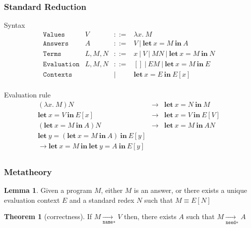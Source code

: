 \documentclass[dvipdfmx,cjk,xcolor=dvipsnames,envcountsect,notheorems,12pt]{beamer}
\theoremstyle{definition}
\newtheorem{theorem}{Theorem}
\newtheorem{lemma}{Lemma}
\newcommand{\keyword}[1]{\mathbf{#1}}
\newcommand{\LET}{\keyword{let}}
\newcommand{\IN}{\keyword{in}}
\begin{document}
\begin{frame}
	\frametitle{Standard Reduction}
	\Large
	Syntax
	{\normalsize \[\begin{array}{llcl}
		\texttt{Values} & V & ::= & \lambda x.~M \\
		\texttt{Answers} & A & ::= & V~|~\LET~x=M~\IN~A \\
		\texttt{Terms} & L, M, N & ::= & x~|~V~|~MN~|~\LET~x=M~\IN~N\\
		\texttt{Evaluation} & L, M, N & ::= & []~|~EM~|~\LET~x=M~\IN~E \\
		\texttt{Contexts} & & | & \LET~x=E~\IN~E[x] \\
	\end{array}\]}

	Evaluation rule
	{\small \[\begin{array}{lcl}
		(\lambda x.~M) N & \longrightarrow & \LET~x=N~\IN~M \\
		\LET~x=V~\IN~E[x] & \longrightarrow & \LET~x=V~\IN~E[V] \\
		(\LET~x=M~\IN~A)N & \longrightarrow & \LET~x=M~\IN~AN \\
		\LET~y=(\LET~x=M~\IN~A)~\IN~E[y] & & \\
		\longrightarrow \LET~x=M~\IN~\LET~y=A~\IN~E[y] & & \\
	\end{array}\]}
\end{frame}

\begin{frame}
	\frametitle{Metatheory}
	\renewcommand{\thelemma}{4.2}
	\begin{lemma}
		Given a program $M$, either $M$ is an answer, or there exists a unique evaluation context $E$ and a standard redex $N$ such that $M\equiv E[N]$
	\end{lemma}

	\renewcommand{\thetheorem}{5.8}
	\begin{theorem}[correctness]
		If $M{\mathop{\longrightarrow}\limits_\texttt{name}} _*V$ then, there exists $A$ such that $M{\mathop{\longrightarrow}\limits_\texttt{need}} _*A$
	\end{theorem}
\end{frame}
\end{document}
